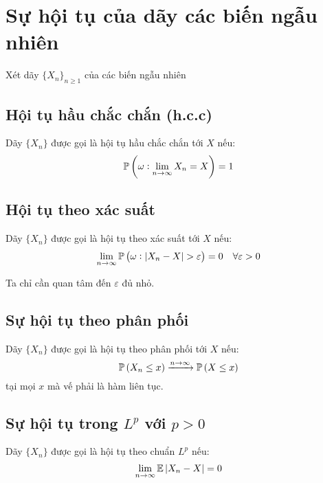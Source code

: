 \section{Sự hội tụ của dãy các biến ngẫu nhiên}
Xét dãy $\{X_n\}_{n \geq 1}$ của các biến ngẫu nhiên
\subsection{Hội tụ hầu chắc chắn (h.c.c)}
Dãy $\{X_n\}$ được gọi là hội tụ hầu chắc chắn tới $X$ nếu: 
$$ \mathbb{P} \left( \omega: \lim\limits_{n \to \infty} X_n = X \right) = 1$$
\subsection{Hội tụ theo xác suất}
Dãy $\{X_n\}$ được gọi là hội tụ theo xác suất tới $X$ nếu:
$$\lim\limits_{n \to \infty} \mathbb{P} \left( \omega: \left| X_n - X \right| > \varepsilon \right) = 0 \quad \forall \varepsilon > 0$$
\begin{remark*}
    Ta chỉ cần quan tâm đến $\varepsilon$ đủ nhỏ.    
\end{remark*}
\subsection{Sự hội tụ theo phân phối}
Dãy $\{X_n\}$ được gọi là hội tụ theo phân phối tới $X$ nếu:
$$\mathbb{P} \left( X_n \leq x \right) \xrightarrow[]{n \to \infty} \mathbb{P} \left( X \leq x \right)$$ tại mọi $x$ mà vế phải là hàm liên tục.
\subsection{Sự hội tụ trong $L^p$ với $p>0$}
Dãy $\{X_n\}$ được gọi là hội tụ theo chuẩn $L^p$ nếu:
$$ \lim\limits_{n \to \infty} \mathbb{E} \left| X_n - X \right| = 0 $$
